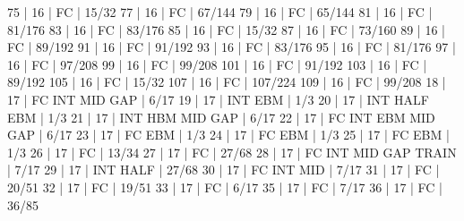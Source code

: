 75    |  16    |    FC                                        | 15/32   
77    |  16    |    FC                                        | 67/144   
79    |  16    |    FC                                        | 65/144   
81    |  16    |    FC                                        | 81/176   
83    |  16    |    FC                                        | 83/176   
85    |  16    |    FC                                        | 15/32   
87    |  16    |    FC                                        | 73/160   
89    |  16    |    FC                                        | 89/192   
91    |  16    |    FC                                        | 91/192   
93    |  16    |    FC                                        | 83/176   
95    |  16    |    FC                                        | 81/176   
97    |  16    |    FC                                        | 97/208   
99    |  16    |    FC                                        | 99/208   
101   |  16    |    FC                                        | 91/192   
103   |  16    |    FC                                        | 89/192   
105   |  16    |    FC                                        | 15/32   
107   |  16    |    FC                                        | 107/224   
109   |  16    |    FC                                        | 99/208   
18    |  17    |    FC  INT                  MID  GAP         | 6/17   
19    |  17    |        INT        EBM                        | 1/3   
20    |  17    |        INT  HALF  EBM                        | 1/3   
21    |  17    |        INT             HBM  MID  GAP         | 6/17   
22    |  17    |    FC  INT        EBM       MID  GAP         | 6/17   
23    |  17    |    FC             EBM                        | 1/3   
24    |  17    |    FC             EBM                        | 1/3   
25    |  17    |    FC             EBM                        | 1/3   
26    |  17    |    FC                                        | 13/34   
27    |  17    |    FC                                        | 27/68   
28    |  17    |    FC  INT                  MID  GAP  TRAIN  | 7/17   
29    |  17    |        INT  HALF                             | 27/68   
30    |  17    |    FC  INT                  MID              | 7/17   
31    |  17    |    FC                                        | 20/51   
32    |  17    |    FC                                        | 19/51   
33    |  17    |    FC                                        | 6/17   
35    |  17    |    FC                                        | 7/17   
36    |  17    |    FC                                        | 36/85   
